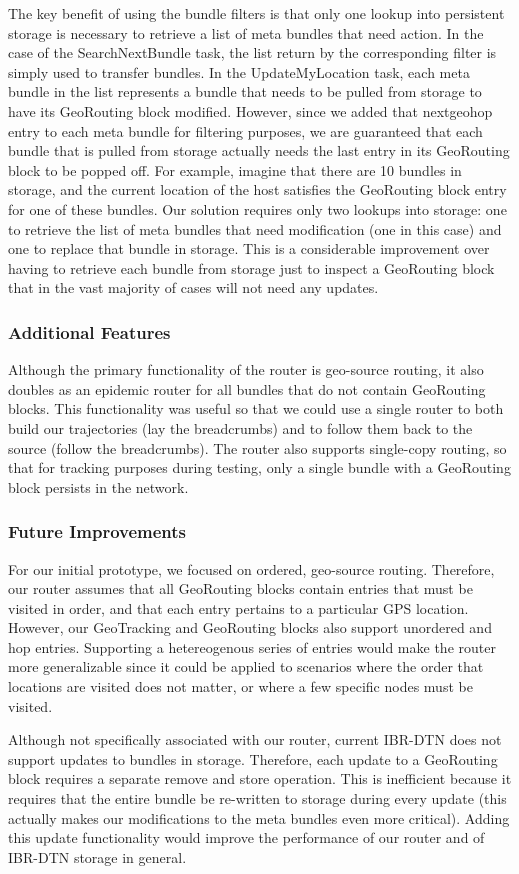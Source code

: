The key benefit of using the {\sc bundle filters} is that only one lookup into persistent storage is necessary to retrieve a list of meta bundles that need action. In the case of the {\sc SearchNextBundle} task, the list return by the corresponding filter is simply used to transfer bundles. In the {\sc UpdateMyLocation} task, each meta bundle in the list represents a bundle that needs to be pulled from storage to have its {\sc GeoRouting} block modified. However, since we added that {\sc nextgeohop} entry to each meta bundle for filtering purposes, we are guaranteed that each bundle that is pulled from storage actually needs the last entry in its {\sc GeoRouting} block to be popped off. For example, imagine that there are 10 bundles in storage, and the current location of the host satisfies the {\sc GeoRouting} block entry for one of these bundles. Our solution requires only two lookups into storage: one to retrieve the list of meta bundles that need modification (one in this case) and one to replace that bundle in storage. This is a considerable improvement over having to retrieve each bundle from storage just to inspect a {\sc GeoRouting} block that in the vast majority of cases will not need any updates.

\subsubsection{Additional Features}
Although the primary functionality of the router is geo-source routing, it also doubles as an epidemic router for all bundles that do not contain {\sc GeoRouting} blocks. This functionality was useful so that we could use a single router to both build our trajectories (lay the breadcrumbs) and to follow them back to the source (follow the breadcrumbs). The router also supports single-copy routing, so that for tracking purposes during testing, only a single bundle with a {\sc GeoRouting} block persists in the network.

\subsubsection{Future Improvements}
For our initial prototype, we focused on ordered, geo-source routing. Therefore, our router assumes that all {\sc GeoRouting} blocks contain entries that must be visited in order, and that each entry pertains to a particular GPS location. However, our {\sc GeoTracking} and {\sc GeoRouting} blocks also support unordered and hop entries. Supporting a hetereogenous series of entries would make the router more generalizable since it could be applied to scenarios where the order that locations are visited does not matter, or where a few specific nodes must be visited.

Although not specifically associated with our router, current IBR-DTN does not support updates to bundles in storage. Therefore, each update to a {\sc GeoRouting} block requires a separate remove and store operation. This is inefficient because it requires that the entire bundle be re-written to storage during every update (this actually makes our modifications to the meta bundles even more critical). Adding this update functionality would improve the performance of our router and of IBR-DTN storage in general.

